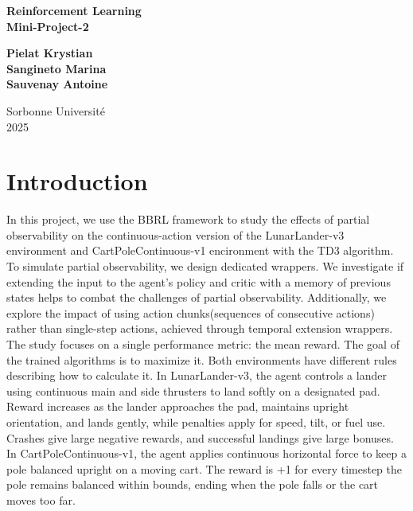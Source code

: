 \documentclass[12pt, a4paper]{article}
\begin{document}
\thispagestyle{empty}

\begin{center}
	{\bfseries \LARGE Reinforcement Learning \\[2mm]
	Mini-Project-2}

	\vfill

	{\large
	\textbf{Pielat Krystian} \\[2mm]
	\textbf{Sangineto Marina} \\[2mm]
	\textbf{Sauvenay Antoine}
	}

	\vfill


	\vfill

	{\large Sorbonne Université} \\[2mm]
	{\large 2025}
\end{center}

\newpage
\tableofcontents
\newpage

\section{Introduction}

In this project, we use the BBRL framework to study the effects of partial observability on the continuous-action version of the LunarLander-v3 environment and CartPoleContinuous-v1 encironment with the TD3 algorithm.\\

To simulate partial observability, we design dedicated wrappers. We investigate if extending the input to the agent’s policy and critic with a memory of previous states helps to combat the challenges of partial observability. Additionally, we explore the impact of using action chunks(sequences of consecutive actions) rather than single-step actions, achieved through temporal extension wrappers.\\

The study focuses on a single performance metric: the mean reward. The goal of the trained algorithms is to maximize it. Both environments have different rules describing how to calculate it. In LunarLander-v3, the agent controls a lander using continuous main and side thrusters to land softly on a designated pad. Reward increases as the lander approaches the pad, maintains upright orientation, and lands gently, while penalties apply for speed, tilt, or fuel use. Crashes give large negative rewards, and successful landings give large bonuses. In CartPoleContinuous-v1, the agent applies continuous horizontal force to keep a pole balanced upright on a moving cart. The reward is +1 for every timestep the pole remains balanced within bounds, ending when the pole falls or the cart moves too far.
\end{document}
